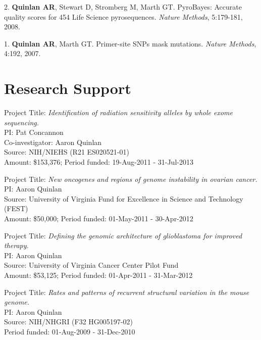 \documentclass[margin,line]{cv}
\begin{document}
\begin{resume}
\begin{list}{*}{}
    \item[2.] \textbf{Quinlan AR}, Stewart D, Stromberg M, Marth GT. 
    PyroBayes: Accurate quality scores for 454 Life Science pyrosequences.
    \textit{Nature Methods}, 5:179-181, 2008.
    
    \item[1.] \textbf{Quinlan AR}, Marth GT. 
    Primer-site SNPs mask mutations. 
    \textit{Nature Methods}, 4:192, 2007.

    \end{list}
    

    \section{\mysidestyle Research Support}
    
    Project Title: \textit{Identification of radiation sensitivity alleles by whole exome sequencing.} \\
    PI: Pat Concannon \\
    Co-investigator: Aaron Quinlan \\
    Source: NIH/NIEHS (R21 ES020521-01) \\
    Amount: \$153,376; Period funded: 19-Aug-2011 - 31-Jul-2013
    
    \vspace{-2mm}
    Project Title: \textit{New oncogenes and regions of genome instability in ovarian cancer.} \\
    PI: Aaron Quinlan \\
    Source: University of Virginia Fund for Excellence in Science and Technology (FEST) \\
    Amount: \$50,000; Period funded: 01-May-2011 - 30-Apr-2012
    
    \vspace{-2mm}
    Project Title: \textit{Defining the genomic architecture of glioblastoma for improved therapy.} \\
    PI: Aaron Quinlan \\
    Source: University of Virginia Cancer Center Pilot Fund\\
    Amount: \$53,125; Period funded: 01-Apr-2011 - 31-Mar-2012
    
    \vspace{-2mm}
    Project Title: \textit{Rates and patterns of recurrent structural variation in the mouse genome.}\\
    PI: Aaron Quinlan\\
    Source: NIH/NHGRI (F32 HG005197-02)\\
    Period funded: 01-Aug-2009 - 31-Dec-2010


\end{resume}
\end{document}
